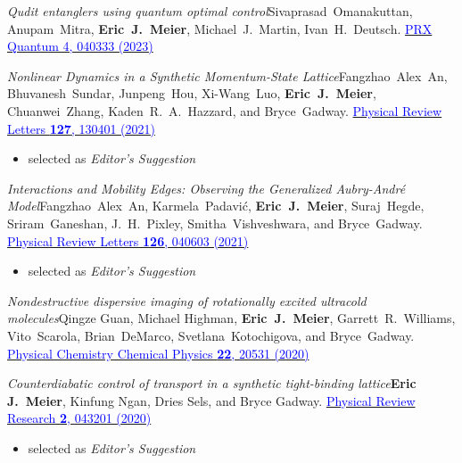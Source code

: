 \documentclass[12pt,letterpaper,sans]{moderncv}
\newcommand*{\paper}[4]{\textit{#1}\newline #2. \newline\href{#3}{\textcolor{blue}{#4}}}
\begin{document}
\begin{etaremune}[topsep=0pt,itemsep=4pt,partopsep=0pt,parsep=0pt]

\item \paper{Qudit entanglers using quantum optimal control}{Sivaprasad~Omanakuttan, Anupam~Mitra, \textbf{Eric~J.~Meier}, Michael~J.~Martin, Ivan~H.~Deutsch}{https://journals.aps.org/prxquantum/abstract/10.1103/PRXQuantum.4.040333}{PRX Quantum 4, 040333 (2023)}

\item \paper{Nonlinear Dynamics in a Synthetic Momentum-State Lattice}{Fangzhao~Alex~An, Bhuvanesh~Sundar, Junpeng~Hou, Xi-Wang~Luo, \textbf{Eric~J.~Meier}, Chuanwei~Zhang, Kaden~R.~A.~Hazzard, and Bryce~Gadway}{https://journals.aps.org/prl/abstract/10.1103/PhysRevLett.127.130401}{Physical Review Letters \textbf{127}, 130401 (2021)}
\begin{itemize}
\item selected as \emph{Editor's Suggestion}
\end{itemize}

\item \paper{Interactions and Mobility Edges: Observing the Generalized Aubry-Andr{\'e} Model}{Fangzhao~Alex~An, Karmela~Padavi{\'c}, \textbf{Eric~J.~Meier}, Suraj~Hegde, Sriram~Ganeshan, J.~H.~Pixley, Smitha~Vishveshwara, and Bryce~Gadway}{https://journals.aps.org/prl/abstract/10.1103/PhysRevLett.126.040603}{Physical Review Letters \textbf{126}, 040603 (2021)}
\begin{itemize}
\item selected as \emph{Editor's Suggestion}
\end{itemize}

\item \paper{Nondestructive dispersive imaging of rotationally excited ultracold molecules}{Qingze Guan, Michael Highman, \textbf{Eric~J.~Meier}, Garrett~R.~Williams, Vito~Scarola, Brian~DeMarco, Svetlana~Kotochigova, and Bryce~Gadway}{http://dx.doi.org/10.1039/D0CP03419C}{Physical Chemistry Chemical Physics \textbf{22}, 20531 (2020)}

\item \paper{Counterdiabatic control of transport in a synthetic tight-binding lattice}{\textbf{Eric J.\ Meier}, Kinfung Ngan, Dries Sels, and Bryce Gadway}{https://journals.aps.org/prresearch/abstract/10.1103/PhysRevResearch.2.043201}{Physical Review Research \textbf{2}, 043201 (2020)}
\begin{itemize}
\item selected as \emph{Editor's Suggestion}
\end{itemize}


\end{etaremune}
\end{document}

